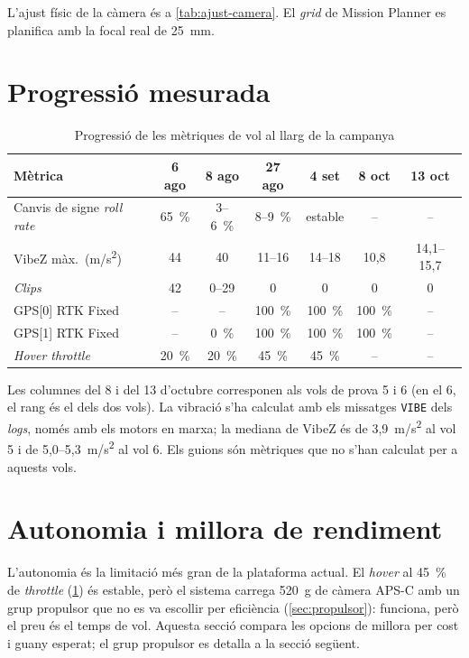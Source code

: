 L'ajust físic de la càmera és a \cref{tab:ajust-camera}. El \emph{grid} de Mission Planner es planifica amb la focal real de 25~mm.

\section{Progressió mesurada}
\label{sec:progressio-mesurada}

\begin{table}[H]
    \centering
    \caption{Progressió de les mètriques de vol al llarg de la campanya}
    \label{tab:progressio}
    \begin{tabular}{lcccccc}
        \toprule
        Mètrica & 6 ago & 8 ago & 27 ago & 4 set & 8 oct & 13 oct \\
        \midrule
        Canvis de signe \emph{roll rate} & 65~\% & 3--6~\% & 8--9~\% & estable & -- & -- \\
        VibeZ màx.\ (m/s\textsuperscript{2}) & 44 & 40 & 11--16 & 14--18 & 10,8 & 14,1--15,7 \\
        \emph{Clips} & 42 & 0--29 & 0 & 0 & 0 & 0 \\
        GPS[0] RTK Fixed & -- & -- & 100~\% & 100~\% & 100~\% & -- \\
        GPS[1] RTK Fixed & -- & 0~\% & 100~\% & 100~\% & 100~\% & -- \\
        \emph{Hover throttle} & 20~\% & 20~\% & 45~\% & 45~\% & -- & -- \\
        \bottomrule
    \end{tabular}
\end{table}

Les columnes del 8 i del 13 d'octubre corresponen als vols de prova 5 i 6 (en el 6, el rang és el dels dos vols). La vibració s'ha calculat amb els missatges \texttt{VIBE} dels \emph{logs}, només amb els motors en marxa; la mediana de VibeZ és de 3,9~m/s\textsuperscript{2} al vol 5 i de 5,0--5,3~m/s\textsuperscript{2} al vol 6. Els guions són mètriques que no s'han calculat per a aquests vols.

\section{Autonomia i millora de rendiment}
\label{sec:autonomia}

L'autonomia és la limitació més gran de la plataforma actual. El \emph{hover} al 45~\% de \emph{throttle} (\cref{tab:progressio}) és estable, però el sistema carrega 520~g de càmera APS-C amb un grup propulsor que no es va escollir per eficiència (\cref{sec:propulsor}): funciona, però el preu és el temps de vol. Aquesta secció compara les opcions de millora per cost i guany esperat; el grup propulsor es detalla a la secció següent.


